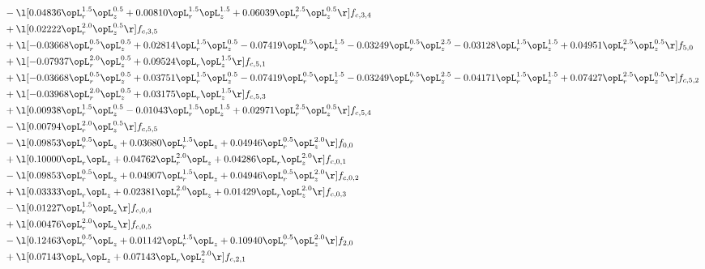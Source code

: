 \begin{alignat}{2}
& - \l[  0.04836 \opL_r^{1.5} \opL_z^{0.5} +  0.00810 \opL_r^{1.5} \opL_z^{1.5} +  0.06039 \opL_r^{2.5} \opL_z^{0.5}  \r] f_{c,3,4} \nonumber \\ 
& + \l[  0.02222 \opL_r^{2.0} \opL_z^{0.5}  \r] f_{c,3,5} \nonumber \\ 
& + \l[  -0.03668 \opL_r^{0.5} \opL_z^{0.5} +  0.02814 \opL_r^{1.5} \opL_z^{0.5}   -0.07419 \opL_r^{0.5} \opL_z^{1.5}   -0.03249 \opL_r^{0.5} \opL_z^{2.5}   -0.03128 \opL_r^{1.5} \opL_z^{1.5} +  0.04951 \opL_r^{2.5} \opL_z^{0.5}  \r] f_{5,0} \nonumber \\ 
& + \l[  -0.07937 \opL_r^{2.0} \opL_z^{0.5} +  0.09524 \opL_r \opL_z^{1.5}  \r] f_{c,5,1} \nonumber \\ 
& + \l[  -0.03668 \opL_r^{0.5} \opL_z^{0.5} +  0.03751 \opL_r^{1.5} \opL_z^{0.5}   -0.07419 \opL_r^{0.5} \opL_z^{1.5}   -0.03249 \opL_r^{0.5} \opL_z^{2.5}   -0.04171 \opL_r^{1.5} \opL_z^{1.5} +  0.07427 \opL_r^{2.5} \opL_z^{0.5}  \r] f_{c,5,2} \nonumber \\ 
& + \l[  -0.03968 \opL_r^{2.0} \opL_z^{0.5} +  0.03175 \opL_r \opL_z^{1.5}  \r] f_{c,5,3} \nonumber \\ 
& + \l[  0.00938 \opL_r^{1.5} \opL_z^{0.5}   -0.01043 \opL_r^{1.5} \opL_z^{1.5} +  0.02971 \opL_r^{2.5} \opL_z^{0.5}  \r] f_{c,5,4} \nonumber \\ 
& - \l[  0.00794 \opL_r^{2.0} \opL_z^{0.5}  \r] f_{c,5,5} \nonumber \\ 
& - \l[  0.09853 \opL_r^{0.5} \opL_z +  0.03680 \opL_r^{1.5} \opL_z +  0.04946 \opL_r^{0.5} \opL_z^{2.0}  \r] f_{0,0} \nonumber \\ 
& + \l[  0.10000 \opL_r \opL_z +  0.04762 \opL_r^{2.0} \opL_z +  0.04286 \opL_r \opL_z^{2.0}  \r] f_{c,0,1} \nonumber \\ 
& - \l[  0.09853 \opL_r^{0.5} \opL_z +  0.04907 \opL_r^{1.5} \opL_z +  0.04946 \opL_r^{0.5} \opL_z^{2.0}  \r] f_{c,0,2} \nonumber \\ 
& + \l[  0.03333 \opL_r \opL_z +  0.02381 \opL_r^{2.0} \opL_z +  0.01429 \opL_r \opL_z^{2.0}  \r] f_{c,0,3} \nonumber \\ 
& - \l[  0.01227 \opL_r^{1.5} \opL_z  \r] f_{c,0,4} \nonumber \\ 
& + \l[  0.00476 \opL_r^{2.0} \opL_z  \r] f_{c,0,5} \nonumber \\ 
& - \l[  0.12463 \opL_r^{0.5} \opL_z +  0.01142 \opL_r^{1.5} \opL_z +  0.10940 \opL_r^{0.5} \opL_z^{2.0}  \r] f_{2,0} \nonumber \\ 
& + \l[  0.07143 \opL_r \opL_z +  0.07143 \opL_r \opL_z^{2.0}  \r] f_{c,2,1} \nonumber \\ 

\end{alignat}
